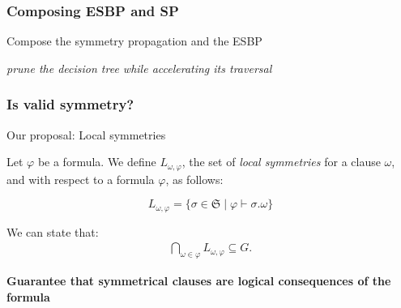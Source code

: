 \documentclass{beamer}
\begin{document}
\begin{frame}
\frametitle{Composing ESBP and SP}


Compose the symmetry propagation and the ESBP\\
\begin{center}
	\textit{prune the decision tree while accelerating its traversal}
\end{center}

\vfill
{}

\end{frame}


\begin{frame}
	\frametitle{Is valid symmetry?}
	\newcommand{\symm}[0]{\ensuremath{\mathfrak{S}}}
	Our proposal: Local symmetries
	
	
	
	\vfill
	
	\begin{block}{}
		Let $\varphi$ be a formula. We define $L_{\omega,\varphi}$,
		the set of \textit{local symmetries} for a clause $\omega$, and with respect to
		a formula $\varphi$, as follows:
		
		$$L_{\omega,\varphi}=\{\sigma \in \symm \mid \varphi \vdash \sigma.\omega\}$$
	\end{block}
	
		\vfill
		We can state that:
		\begin{align*}
		\underset{\omega \in \varphi}{\bigcap}L_{\omega,\varphi} \subseteq G. %
		\end{align*}
	
	\begin{center}
		\textbf{Guarantee that symmetrical clauses are logical consequences of the formula}
	\end{center}
	
\end{frame}
\end{document}
